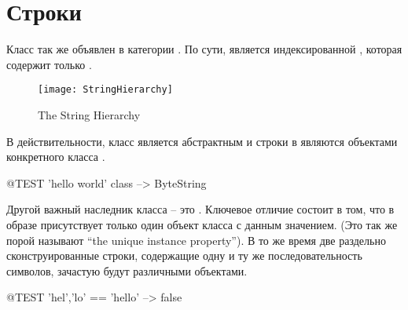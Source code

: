 \documentclass[a4paper,10pt,twoside]{book}
\begin{document}
\section{Строки}

Класс  так же объявлен в категории . По сути,  является индексированной , которая содержит только .

\begin{figure}[ht]
	{\centerline {\texttt{[image: StringHierarchy]}}}
\caption{The String Hierarchy }
\end{figure}

В действительности, класс  является абстрактным и строки в \pharo являются объектами конкретного класса .

\begin{code}{@TEST}
'hello world' class --> ByteString
\end{code}

Другой важный наследник класса  -- это .  Ключевое отличие состоит в том, что в образе присутствует только один объект класса   с данным значением.  (Это так же порой называют ``the unique instance property'').  В то же время две раздельно сконструированные строки, содержащие одну и ту же последовательность символов, зачастую будут различными объектами.


\begin{code}{@TEST}
'hel','lo' == 'hello' --> false
\end{code}
\end{document}

